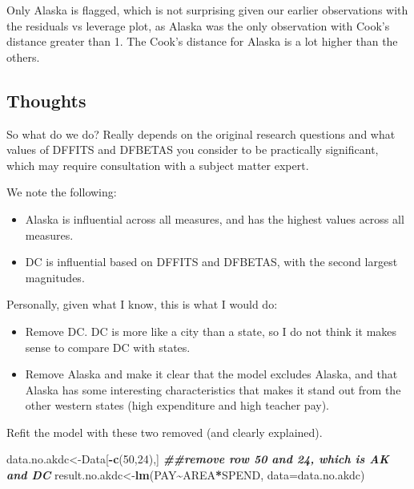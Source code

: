\documentclass[
]{book}
\newenvironment{Shaded}{\begin{snugshade}}{\end{snugshade}}
\newcommand{\AttributeTok}[1]{\textcolor[rgb]{0.13,0.29,0.53}{#1}}
\newcommand{\DecValTok}[1]{\textcolor[rgb]{0.00,0.00,0.81}{#1}}
\newcommand{\DocumentationTok}[1]{\textcolor[rgb]{0.56,0.35,0.01}{\textbf{\textit{#1}}}}
\newcommand{\FunctionTok}[1]{\textcolor[rgb]{0.13,0.29,0.53}{\textbf{#1}}}
\newcommand{\NormalTok}[1]{#1}
\newcommand{\OtherTok}[1]{\textcolor[rgb]{0.56,0.35,0.01}{#1}}
\newcommand{\SpecialCharTok}[1]{\textcolor[rgb]{0.81,0.36,0.00}{\textbf{#1}}}
\providecommand{\tightlist}{%
  \setlength{\itemsep}{0pt}\setlength{\parskip}{0pt}}
\begin{document}
Only Alaska is flagged, which is not surprising given our earlier observations with the residuals vs leverage plot, as Alaska was the only observation with Cook's distance greater than 1. The Cook's distance for Alaska is a lot higher than the others.

\hypertarget{thoughts}{%
\subsection*{Thoughts}\label{thoughts}}

So what do we do? Really depends on the original research questions and what values of DFFITS and DFBETAS you consider to be practically significant, which may require consultation with a subject matter expert.

We note the following:

\begin{itemize}
\tightlist
\item
  Alaska is influential across all measures, and has the highest values across all measures.
\item
  DC is influential based on DFFITS and DFBETAS, with the second largest magnitudes.
\end{itemize}

Personally, given what I know, this is what I would do:

\begin{itemize}
\tightlist
\item
  Remove DC. DC is more like a city than a state, so I do not think it makes sense to compare DC with states.
\item
  Remove Alaska and make it clear that the model excludes Alaska, and that Alaska has some interesting characteristics that makes it stand out from the other western states (high expenditure and high teacher pay).
\end{itemize}

Refit the model with these two removed (and clearly explained).

\begin{Shaded}
\begin{Highlighting}[]
\NormalTok{data.no.akdc}\OtherTok{\textless{}{-}}\NormalTok{Data[}\SpecialCharTok{{-}}\FunctionTok{c}\NormalTok{(}\DecValTok{50}\NormalTok{,}\DecValTok{24}\NormalTok{),] }\DocumentationTok{\#\#remove row 50 and 24, which is AK and DC}
\NormalTok{result.no.akdc}\OtherTok{\textless{}{-}}\FunctionTok{lm}\NormalTok{(PAY}\SpecialCharTok{\textasciitilde{}}\NormalTok{AREA}\SpecialCharTok{*}\NormalTok{SPEND, }\AttributeTok{data=}\NormalTok{data.no.akdc) }
\end{Highlighting}
\end{Shaded}
\end{document}
